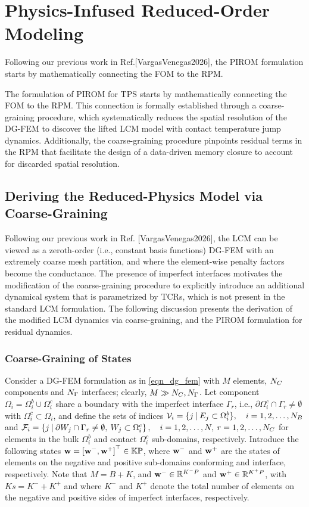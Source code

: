 \section{Physics-Infused Reduced-Order Modeling}

Following our previous work in Ref.[VargasVenegas2026], the PIROM formulation starts by mathematically connecting the FOM to the RPM. 

The formulation of PIROM for TPS starts by mathematically connecting the FOM to the RPM. This connection is formally established through a coarse-graining procedure, which systematically reduces the spatial resolution of the DG-FEM to discover the lifted LCM model with contact temperature jump dynamics. Additionally, the coarse-graining procedure pinpoints residual terms in the RPM that facilitate the design of a data-driven memory closure to account for discarded spatial resolution.

\subsection{Deriving the Reduced-Physics Model via Coarse-Graining}

Following our previous work in Ref. [VargasVenegas2026], the LCM can be viewed as a zeroth-order (i.e., constant basis functions) DG-FEM with an extremely coarse mesh partition, and where the element-wise penalty factors become the conductance. The presence of imperfect interfaces motivates the modification of the coarse-graining procedure to explicitly introduce an additional dynamical system that is parametrized by TCRs, which is not present in the standard LCM formulation. The following discussion presents the derivation of the modified LCM dynamics via coarse-graining, and the PIROM formulation for residual dynamics.

\subsubsection{Coarse-Graining of States}

Consider a DG-FEM formulation as in \cref{eqn_dg_fem} with $M$ elements, $N_C$ components and $N_{\Gamma}$ interfaces; clearly, $M \gg N_C,N_{\Gamma}$. Let component $\Omega_i=\Omega_i^b\cup\Omega_i^c$ share a boundary with the imperfect interface $\Gamma_r$, i.e., $\partial\Omega_i^c\cap\Gamma_r\neq\emptyset$ with $\Omega_i^c\subset\Omega_i$, and define the sets of indices $\mathcal{V}_i=\{j \:|\: E_j\subset\Omega_i^b\},\quad i=1,2,\dots,N_B$ and $\mathcal{F}_i=\left\{j \:|\: \partial W_j\cap\Gamma_r\neq\emptyset,\: W_j\subset\Omega_i^c\right\},\quad i=1,2,\dots,N,\:r=1,2,\dots,N_C$ for elements in the bulk $\Omega_i^b$ and contact $\Omega_i^c$ sub-domains, respectively. Introduce the following states $\mathbf{w}=\left[\mathbf{w}^{-},\mathbf{w}^{+}\right]^\top\in\mathbb{KP}$, where $\mathbf{w}^{-}$ and $\mathbf{w}^{+}$ are the states of elements on the negative and positive sub-domains conforming and interface, respectively. Note that $M=B+K$, and $\mathbf{w}^{-}\in\mathbb{R}^{K^{-}P}$ and $\mathbf{w}^{+}\in\mathbb{R}^{K^{+}P}$, with $Ks=K^{-}+K^{+}$ and where $K^{-}$ and $K^{+}$ denote the total number of elements on the negative and positive sides of imperfect interfaces, respectively.


